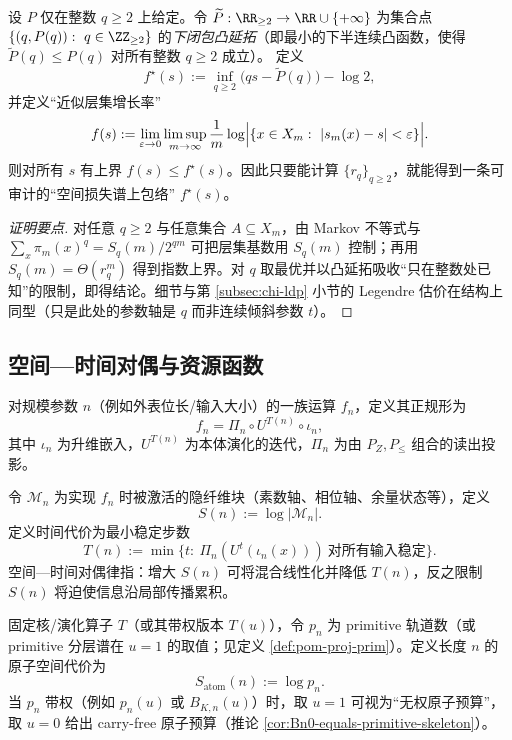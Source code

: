 \begin{proposition}\label{prop:pom-fold-multifractal-envelope}
设 $P$ 仅在整数 $q\ge 2$ 上给定。令 $\widetilde P:\RR_{\ge 2}\to\RR\cup\{+\infty\}$ 为集合点 $\{(q,P(q)):\ q\in\ZZ_{\ge 2}\}$ 的\emph{下闭包凸延拓}（即最小的下半连续凸函数，使得 $\widetilde P(q)\le P(q)$ 对所有整数 $q\ge2$ 成立）。
定义
\[
f^\star(s):=\inf_{q\ge 2}\bigl(qs-\widetilde P(q)\bigr)-\log 2,
\]
并定义“近似层集增长率”
\[
f(s):=\lim_{\varepsilon\to 0}\limsup_{m\to\infty}\frac{1}{m}\log\Bigl|\{x\in X_m:\ |s_m(x)-s|<\varepsilon\}\Bigr|.
\]
则对所有 $s$ 有上界 $f(s)\le f^\star(s)$。因此只要能计算 $\{r_q\}_{q\ge 2}$，就能得到一条可审计的“空间损失谱上包络” $f^\star(s)$。
\end{proposition}
\begin{proof}[证明要点]
对任意 $q\ge 2$ 与任意集合 $A\subseteq X_m$，由 Markov 不等式与
\(
\sum_x \pi_m(x)^q=S_q(m)/2^{qm}
\)
可把层集基数用 $S_q(m)$ 控制；再用 $S_q(m)=\Theta(r_q^m)$ 得到指数上界。对 $q$ 取最优并以凸延拓吸收“只在整数处已知”的限制，即得结论。细节与第 \ref{subsec:chi-ldp} 小节的 Legendre 估价在结构上同型（只是此处的参数轴是 $q$ 而非连续倾斜参数 $t$）。
\end{proof}

\subsection{空间—时间对偶与资源函数}\label{subsec:pom-resources}
\begin{definition}[嵌入—演化—投影正规形]\label{def:pom-normal-form}
对规模参数 $n$（例如外表位长/输入大小）的一族运算 $f_n$，定义其正规形为
\[
f_n=\Pi_n\circ U^{T(n)}\circ \iota_n,
\]
其中 $\iota_n$ 为升维嵌入，$U^{T(n)}$ 为本体演化的迭代，$\Pi_n$ 为由 $P_Z,P_{\le}$ 组合的读出投影。
\end{definition}

\begin{definition}[空间代价与时间代价]\label{def:pom-space-time}
令 $\mathcal M_n$ 为实现 $f_n$ 时被激活的隐纤维块（素数轴、相位轴、余量状态等），定义
\[
S(n):=\log|\mathcal M_n|.
\]
定义时间代价为最小稳定步数
\[
T(n):=\min\{t:\ \Pi_n(U^t(\iota_n(x)))\ \text{对所有输入稳定}\}.
\]
空间—时间对偶律指：增大 $S(n)$ 可将混合线性化并降低 $T(n)$，反之限制 $S(n)$ 将迫使信息沿局部传播累积。
\end{definition}

\begin{definition}\label{def:pom-atom-space-cost}
固定核/演化算子 $T$（或其带权版本 $T(u)$），令 $p_n$ 为 primitive 轨道数（或 primitive 分层谱在 $u=1$ 的取值；见定义 \ref{def:pom-proj-prim}）。定义长度 $n$ 的原子空间代价为
$$
S_{\mathrm{atom}}(n):=\log p_n.
$$
当 $p_n$ 带权（例如 $p_n(u)$ 或 $B_{K,n}(u)$）时，取 $u=1$ 可视为“无权原子预算”，取 $u=0$ 给出 carry-free 原子预算（推论 \ref{cor:Bn0-equals-primitive-skeleton}）。
\end{definition}

